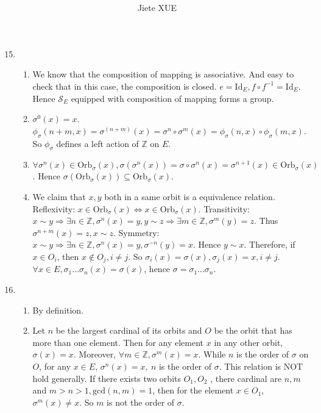 \documentclass{article}
\title{\textbf{\mytitle}}
\author{Jiete XUE}
\date{\mydate}
\newcommand{\ZZ}{\mathbb{Z}}
\begin{document}
\maketitle
\begin{enumerate}

\setcounter{enumi}{14}
    \item \begin{enumerate}
            \item We know that the composition of mapping is associative. And easy to check that in this case, the composition is closed. $e=\mathrm{Id}_E,f\circ f^{-1}=\mathrm{Id}_E$. Hence $\mathcal{S}_E$ equipped with composition of mapping forms a group.
            \item $\sigma^0(x)=x$. $\phi_\sigma(n+m,x)=\sigma^{(n+m)}(x)=\sigma^n\circ\sigma^m(x)=\phi_\sigma(n,x)\circ\phi_{\sigma}(m,x)$. So $\phi_\sigma$ defines a left action of $\ZZ$ on $E$.
            \item $\forall\sigma^n(x)\in \mathrm{Orb}_\sigma(x), \sigma(\sigma^n(x))=\sigma\circ\sigma^n(x)=\sigma^{n+1}(x)\in \mathrm{Orb}_\sigma(x)$. Hence $\sigma(\mathrm{Orb}_\sigma(x))\subseteq \mathrm{Orb}_\sigma(x)$.
            \item We claim that $x,y$ both in a same orbit is a equivalence relation. Reflexivity: $x\in \mathrm{Orb}_\sigma(x)\Leftrightarrow x\in \mathrm{Orb}_\sigma(x) $. Transitivity: $x\sim y\Rightarrow \exists n\in \ZZ, \sigma^n(x)=y, y\sim z\Rightarrow \exists m\in \ZZ, \sigma^m(y)=z$. Thus $\sigma^{n+m}(x)=z, x\sim z$. Symmetry: $x\sim y\Rightarrow \exists n\in \ZZ, \sigma^n(x)=y, \sigma^{-n}(y)=x$. Hence $y\sim x$. Therefore, if $x\in O_i$, then $x\notin O_j,i\not=j$. So $\sigma_i(x)=\sigma(x),\sigma_j(x)=x,i\not=j$. $\forall x\in E, \sigma_1\dots\sigma_n(x)=\sigma(x)$, hence $\sigma=\sigma_1\dots\sigma_n$.
        \end{enumerate}
    \item 
        \begin{enumerate}
            \item By definition.
            \item Let $n$ be the largest cardinal of its orbits and $O$ be the orbit that has more than one element. Then for any element $x$ in any other orbit,  $\sigma(x)=x$. Moreover, $\forall m\in \ZZ, \sigma^m(x)=x$. While $n$ is the order of $\sigma$ on $O$, for any $x\in E$, $\sigma^n(x)=x,\  n$ is the order of $\sigma$. This relation is NOT hold generally. If there exists two orbits $O_1,O_2$ , there cardinal are $n,m$ and $m>n>1,\mathrm{gcd}(n,m)=1 $, then for the element $x\in O_1$,  $\sigma^m(x)\not= x$. So $m$ is not the order of $\sigma$.

\end{enumerate}
\end{enumerate}
\end{document}
